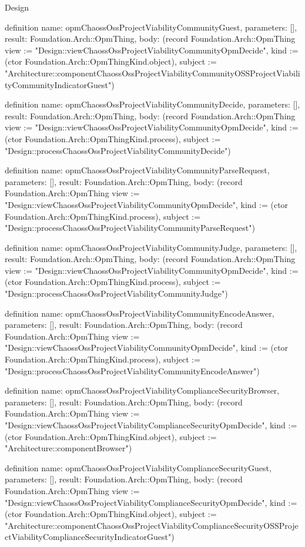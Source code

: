 \begin{lexlean}{Design}
\begin{semanticmodule}
definition{
  name: opmChaossOssProjectViabilityCommunityGuest,
  parameters: [],
  result: Foundation.Arch::OpmThing,
  body: (record Foundation.Arch::OpmThing {view := "Design::viewChaossOssProjectViabilityCommunityOpmDecide", kind := (ctor Foundation.Arch::OpmThingKind.object), subject := "Architecture::componentChaossOssProjectViabilityCommunityOSSProjectViabilityCommunityIndicatorGuest"})
}

definition{
  name: opmChaossOssProjectViabilityCommunityDecide,
  parameters: [],
  result: Foundation.Arch::OpmThing,
  body: (record Foundation.Arch::OpmThing {view := "Design::viewChaossOssProjectViabilityCommunityOpmDecide", kind := (ctor Foundation.Arch::OpmThingKind.process), subject := "Design::processChaossOssProjectViabilityCommunityDecide"})
}

definition{
  name: opmChaossOssProjectViabilityCommunityParseRequest,
  parameters: [],
  result: Foundation.Arch::OpmThing,
  body: (record Foundation.Arch::OpmThing {view := "Design::viewChaossOssProjectViabilityCommunityOpmDecide", kind := (ctor Foundation.Arch::OpmThingKind.process), subject := "Design::processChaossOssProjectViabilityCommunityParseRequest"})
}

definition{
  name: opmChaossOssProjectViabilityCommunityJudge,
  parameters: [],
  result: Foundation.Arch::OpmThing,
  body: (record Foundation.Arch::OpmThing {view := "Design::viewChaossOssProjectViabilityCommunityOpmDecide", kind := (ctor Foundation.Arch::OpmThingKind.process), subject := "Design::processChaossOssProjectViabilityCommunityJudge"})
}

definition{
  name: opmChaossOssProjectViabilityCommunityEncodeAnswer,
  parameters: [],
  result: Foundation.Arch::OpmThing,
  body: (record Foundation.Arch::OpmThing {view := "Design::viewChaossOssProjectViabilityCommunityOpmDecide", kind := (ctor Foundation.Arch::OpmThingKind.process), subject := "Design::processChaossOssProjectViabilityCommunityEncodeAnswer"})
}

definition{
  name: opmChaossOssProjectViabilityComplianceSecurityBrowser,
  parameters: [],
  result: Foundation.Arch::OpmThing,
  body: (record Foundation.Arch::OpmThing {view := "Design::viewChaossOssProjectViabilityComplianceSecurityOpmDecide", kind := (ctor Foundation.Arch::OpmThingKind.object), subject := "Architecture::componentBrowser"})
}

definition{
  name: opmChaossOssProjectViabilityComplianceSecurityGuest,
  parameters: [],
  result: Foundation.Arch::OpmThing,
  body: (record Foundation.Arch::OpmThing {view := "Design::viewChaossOssProjectViabilityComplianceSecurityOpmDecide", kind := (ctor Foundation.Arch::OpmThingKind.object), subject := "Architecture::componentChaossOssProjectViabilityComplianceSecurityOSSProjectViabilityComplianceSecurityIndicatorGuest"})
}


\end{semanticmodule}
\end{lexlean}

